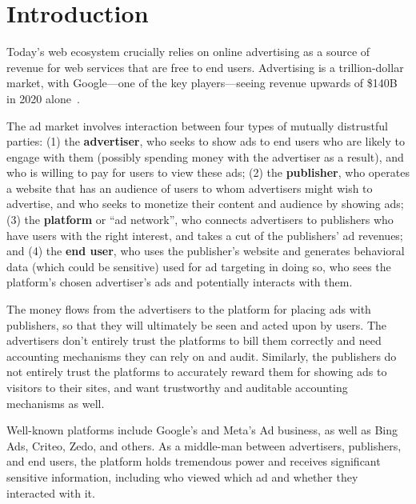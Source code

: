 \section{Introduction}
\label{s:overview}


Today's web ecosystem crucially relies on online advertising as a source of
revenue for web services that are free to end users.
%
Advertising is a trillion-dollar market, with Google---one of the key
players---seeing revenue upwards of \$140B in 2020 alone~\cite{xxx}.
%

The ad market involves interaction between four types of mutually distrustful parties:
(1) the \textbf{advertiser}, who seeks to show ads to end users who
   are likely to engage with them (possibly spending money with the
   advertiser as a result), and who is willing to pay for users to view
   these ads;
(2) the \textbf{publisher}, who operates a website that has an audience
   of users to whom advertisers might wish to advertise, and who seeks
   to monetize their content and audience by showing ads;
 (3) the \textbf{platform} or ``ad network'', who connects advertisers
   to publishers who have users with the right interest, and takes a cut
   of the publishers' ad revenues; and
 (4) the \textbf{end user}, who uses the publisher's website and generates
   behavioral data (which could be sensitive) used for ad targeting in doing so,
   who sees the platform's chosen advertiser's ads and potentially interacts
   with them.

The money flows from the advertisers to the platform for placing ads with publishers, so that they will ultimately be seen and acted upon by users.
%
The advertisers don't entirely trust the platforms to bill them correctly and need accounting mechanisms they can rely on and audit.
%
Similarly, the publishers do not entirely trust the platforms to accurately reward them for showing ads to visitors to their sites, and want trustworthy and auditable accounting mechanisms as well.

%
Well-known platforms include Google's and Meta's Ad business, as well
as Bing Ads, Criteo, Zedo, and others.
%
As a middle-man between advertisers, publishers, and end users, the platform
holds tremendous power and receives significant sensitive information, including
who viewed which ad and whether they interacted with it.
%
%
%

